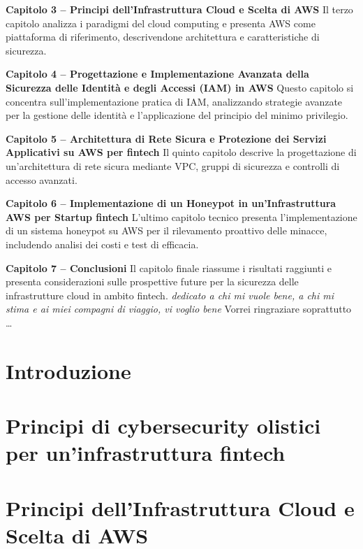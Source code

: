 \documentclass[a4paper,12pt]{report}
\begin{document}
\textbf{Capitolo 3 – Principi dell'Infrastruttura Cloud e Scelta di AWS} Il terzo 
capitolo analizza i paradigmi del cloud computing e presenta AWS come 
piattaforma di riferimento, descrivendone architettura e caratteristiche 
di sicurezza.

\textbf{Capitolo 4 – Progettazione e Implementazione Avanzata della Sicurezza delle 
Identità e degli Accessi (IAM) in AWS} Questo capitolo si concentra sull'implementazione 
pratica di IAM, analizzando strategie avanzate per la gestione delle identità 
e l'applicazione del principio del minimo privilegio.

\textbf{Capitolo 5 – Architettura di Rete Sicura e Protezione dei Servizi Applicativi 
su AWS per fintech} Il quinto capitolo descrive la progettazione di un'architettura 
di rete sicura mediante VPC, gruppi di sicurezza e controlli di accesso avanzati.

\textbf{Capitolo 6 – Implementazione di un Honeypot in un'Infrastruttura AWS per 
Startup fintech} L'ultimo capitolo tecnico presenta l'implementazione di un 
sistema honeypot su AWS per il rilevamento proattivo delle minacce, includendo 
analisi dei costi e test di efficacia.

\textbf{Capitolo 7 – Conclusioni} Il capitolo finale riassume i risultati raggiunti 
e presenta considerazioni sulle prospettive future per la sicurezza delle 
infrastrutture cloud in ambito fintech.
{\hfill \Large {\sl dedicato a chi mi vuole bene, a chi mi stima e ai miei compagni di viaggio, vi voglio bene}}
        Vorrei ringraziare soprattutto \dots

\setcounter{tocdepth}{2} %
\tableofcontents
\listoffigures %

\chapter{Introduzione}
\label{chapter:introduzione}


\chapter{Principi di cybersecurity olistici \allowbreak{} per un'infrastruttura fintech}
\label{ch:principi-cybersecurity}


\chapter{Principi dell'Infrastruttura Cloud e Scelta di AWS}
\label{ch:cloud-aws}

\end{document}
